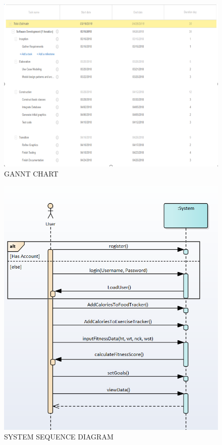 \documentclass[10pt]{article}
\begin{document}
\begin{figure}[p!]
	\begin{center}
		\includegraphics[width=\columnwidth]{GANNTCHART.png}
		\caption{{GANNT CHART
				{\label{div-381784}}%
		}}
	\end{center}
\end{figure}


\begin{figure}[p!]
	\begin{center}
		\includegraphics[width=\columnwidth]{SSD.png}
		\caption{{SYSTEM SEQUENCE DIAGRAM
				{\label{div-941985}}%
		}}
	\end{center}
\end{figure}
\end{document}
